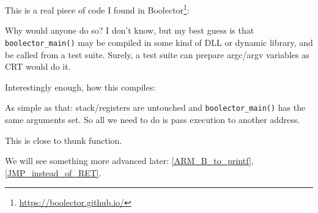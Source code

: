 \label{Boolector}

This is a real piece of code I found in Boolector\footnote{\url{https://boolector.github.io/}}:



Why would anyone do so?
I don't know, but my best guess is that \verb|boolector_main()| may be compiled in some kind of DLL or dynamic library,
and be called from a test suite.
Surely, a test suite can prepare argc/argv variables as \ac{CRT} would do it.

Interestingly enough, how this compiles:



As simple as that: stack/registers are untouched and \verb|boolector_main()| has the same arguments set.
So all we need to do is pass execution to another address.

This is close to \gls{thunk function}.

We will see something more advanced later: \ref{ARM_B_to_printf}, \ref{JMP_instead_of_RET}.

